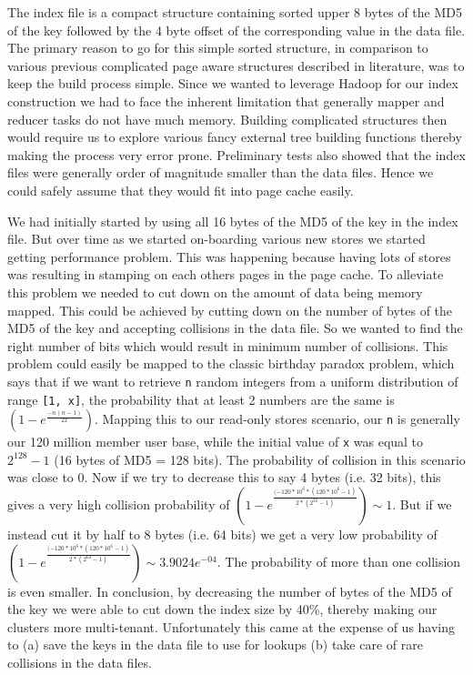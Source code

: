 \documentclass[twocolumn]{article}
\begin{document}
The index file is a compact structure containing sorted upper 8 bytes of the MD5 of the key followed by the 4 byte offset of the corresponding value in the data file. The primary reason to go for this simple sorted structure, in comparison to various previous complicated page aware structures described in literature, was to keep the build process simple. Since we wanted to leverage Hadoop for our index construction we had to face the inherent limitation that generally mapper and reducer tasks do not have much memory. Building complicated structures then would require us to explore various fancy external tree building functions thereby making the process very error prone. Preliminary tests also showed that the index files were generally order of magnitude smaller than the data files. Hence we could safely assume that they would fit into page cache easily. 

We had initially started by using all 16 bytes of the MD5 of the key in the index file. But over time as we started on-boarding various new stores we started getting performance problem. This was happening because having lots of stores was resulting in stamping on each others pages in the page cache. To alleviate this problem we needed to cut down on the amount of data being memory mapped. This could be achieved by cutting down on the number of bytes of the MD5 of the key and accepting collisions in the data file. So we wanted to find the right number of bits which would result in minimum number of collisions. This problem could easily be mapped to the classic birthday paradox problem,  which says that if we want to retrieve \verb=n= random integers from a uniform distribution of range \verb=[1, x]=, the probability that at least 2 numbers are the same is  $(1 - e^{\frac{-n(n-1)}{2x}})$. Mapping this to our read-only stores scenario, our \verb=n= is generally our 120 million member user base, while the initial value of \verb=x= was equal to $2^{128} - 1$ (16 bytes of MD5 = 128 bits). The probability of collision in this scenario was close to 0. Now if we try to decrease this to say 4 bytes (i.e. 32 bits), this gives a very high collision probability of $(1 - e^{\frac{(-120*10^{6} * (120*10^{6} - 1)}{2 * (2^{32} - 1)}}) \sim 1$. But if we instead cut it by half to 8 bytes (i.e. 64 bits) we get a very low probability of $(1 - e^{\frac{(-120*10^{6} * (120*10^{6} - 1)} { 2 * (2^{64} - 1 )}}) \sim 3.9024e^{-04}$. The probability of more than one collision is even smaller. In conclusion, by decreasing the number of bytes of the MD5 of the key we were able to cut down the index size by 40\%, thereby making our clusters more multi-tenant. Unfortunately this came at the expense of us having to (a) save the keys in the data file to use for lookups (b) take care of rare collisions in the data files.
\end{document}
